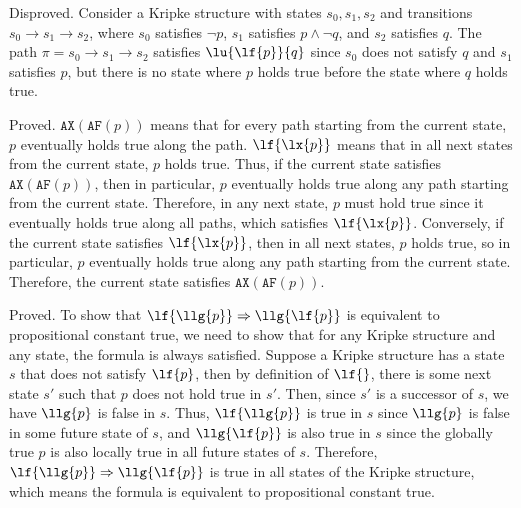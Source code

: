 \documentclass[11pt]{article}
\newcommand{\ax}[1]{\texttt{AX}(#1)}
\newcommand{\af}[1]{\texttt{AF}(#1)}
\begin{document}
Disproved. Consider a Kripke structure with states $s_0, s_1, s_2$ and transitions $s_0 \rightarrow s_1 \rightarrow s_2$, where $s_0$ satisfies $\lnot p$, $s_1$ satisfies $p \land \lnot q$, and $s_2$ satisfies $q$. The path $\pi = s_0 \rightarrow s_1 \rightarrow s_2$ satisfies $\lu{\lf{p}}{q}$ since $s_0$ does not satisfy $q$ and $s_1$ satisfies $p$, but there is no state where $p$ holds true before the state where $q$ holds true.

Proved. $\ax{\af{p}}$ means that for every path starting from the current state, $p$ eventually holds true along the path. $\lf{\lx{p}}$ means that in all next states from the current state, $p$ holds true. Thus, if the current state satisfies $\ax{\af{p}}$, then in particular, $p$ eventually holds true along any path starting from the current state. Therefore, in any next state, $p$ must hold true since it eventually holds true along all paths, which satisfies $\lf{\lx{p}}$. Conversely, if the current state satisfies $\lf{\lx{p}}$, then in all next states, $p$ holds true, so in particular, $p$ eventually holds true along any path starting from the current state. Therefore, the current state satisfies $\ax{\af{p}}$.

Proved. To show that $\lf{\llg{p}} \Rightarrow \llg{\lf{p}}$ is equivalent to propositional constant true, we need to show that for any Kripke structure and any state, the formula is always satisfied. Suppose a Kripke structure has a state $s$ that does not satisfy $\lf{p}$, then by definition of $\lf{}$, there is some next state $s'$ such that $p$ does not hold true in $s'$. Then, since $s'$ is a successor of $s$, we have $\llg{p}$ is false in $s$. Thus, $\lf{\llg{p}}$ is true in $s$ since $\llg{p}$ is false in some future state of $s$, and $\llg{\lf{p}}$ is also true in $s$ since the globally true $p$ is also locally true in all future states of $s$. Therefore, $\lf{\llg{p}} \Rightarrow \llg{\lf{p}}$ is true in all states of the Kripke structure, which means the formula is equivalent to propositional constant true.
\end{document}
